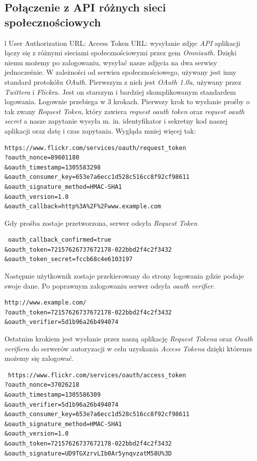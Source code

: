 \documentclass[brudnopis]{xmgr}
\begin{document}
\subsection{Połączenie z API różnych sieci społecznościowych} l User Authorization URL: Access Token URL: wysyłanie zdjęc
\textit{API} aplikacji łączy się z różnymi sieciami społecznościowymi przez gem \textit{Omniauth}. Dzięki niemu możemy po zalogowaniu, wysyłać nasze zdjęcia na dwa serwisy jednocześnie. W zależności od serwisu społecznościowego, używany jest inny standard protokółu \textit{OAuth}. Pierwszym z nich jest \textit{OAuth 1.0a}, używany przez \textit{Twittera} i \textit{Flickr}a. Jest on starszym i bardziej skomplikowanym standardem logowania. Logownie przebiega w 3 krokach. Pierwszy krok to wysłanie prośby o tak zwany \textit{Request Token}, który zawiera \textit{request oauth token} oraz \textit{request oauth secret} a nasze zapytanie wysyła m. in.  identyfikator i sekretny kod naszej aplikacji oraz datę i czas zapytania. Wygląda mniej więcej tak:
\begin{verbatim}
https://www.flickr.com/services/oauth/request_token
?oauth_nonce=89601180
&oauth_timestamp=1305583298
&oauth_consumer_key=653e7a6ecc1d528c516cc8f92cf98611
&oauth_signature_method=HMAC-SHA1
&oauth_version=1.0
&oauth_callback=http%3A%2F%2Fwww.example.com
\end{verbatim}
\newpage
 Gdy prośba zostaje przetworzona, serwer odsyła \textit{Request Token} 
\begin{verbatim}
 oauth_callback_confirmed=true
&oauth_token=72157626737672178-022bbd2f4c2f3432
&oauth_token_secret=fccb68c4e6103197
\end{verbatim}
Następnie użytkownik zostaje przekierowany do strony logowania gdzie podaje swoje dane. Po poprawnym zalogowaniu serwer odsyła \textit{oauth verifier}.
\begin{verbatim}
http://www.example.com/
?oauth_token=72157626737672178-022bbd2f4c2f3432
&oauth_verifier=5d1b96a26b494074
\end{verbatim}
 Ostatnim krokiem jest wysłanie przez naszą aplikację \textit{Request Tokena} oraz \textit{Oauth verifiera} do serwerów autoryzacji w celu uzyskania \textit{Access Tokena} dzięki któremu możemy się zalogować.
 \begin{verbatim}
 https://www.flickr.com/services/oauth/access_token
?oauth_nonce=37026218
&oauth_timestamp=1305586309
&oauth_verifier=5d1b96a26b494074
&oauth_consumer_key=653e7a6ecc1d528c516cc8f92cf98611
&oauth_signature_method=HMAC-SHA1
&oauth_version=1.0
&oauth_token=72157626737672178-022bbd2f4c2f3432
&oauth_signature=UD9TGXzrvLIb0Ar5ynqvzatM58U%3D
\end{verbatim}
\end{document}
